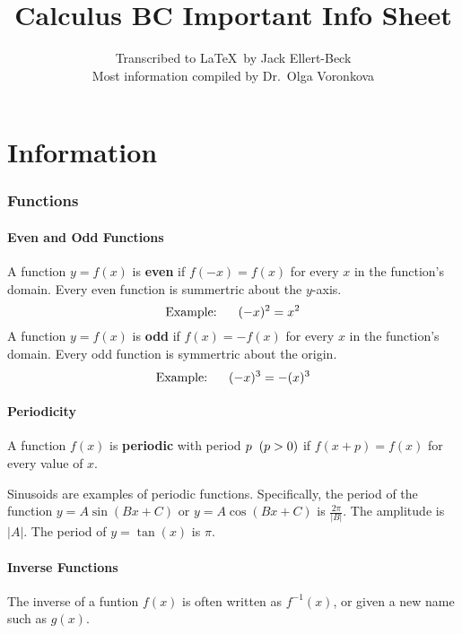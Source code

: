 \documentclass{artikel3}
\begin{document}
\title{Calculus BC Important Info Sheet}
\author{Transcribed to \LaTeX\ by Jack Ellert-Beck\\ 
Most information compiled by Dr.\ Olga Voronkova}
\maketitle

\newpage

\tableofcontents

\newpage

\part{Information}

\section{Functions}

\subsection{Even and Odd Functions}
A function $y=f(x)$ is \textbf{even} if $f(-x)=f(x)$ for every $x$ 
in the function's domain. Every even function is summertric about 
the $y$-axis. \[\text{Example:}\hspace{6 mm} (-x)^2=x^2 \]
A function $y=f(x)$ is \textbf{odd} if $f(x)=-f(x)$ for every $x$ 
in the function's domain. Every odd function is symmertric about 
the origin. \[\text{Example:}\hspace{6 mm} (-x)^3=-(x)^3 \]

\subsection{Periodicity}
A function $f(x)$ is \textbf{periodic} with period $p\hspace{2 mm}(p>0)$ if 
$f(x+p)=f(x)$ for every value of $x$.

Sinusoids are examples of periodic functions. Specifically, the period
of the function $y=A\sin(Bx+C)$ or $y=A\cos(Bx+C)$ is $\frac{2\pi}{|B|}$.
The amplitude is $|A|$. The period of $y=\tan(x)$ is $\pi$.

\subsection{Inverse Functions}
The inverse of a funtion $f(x)$ is often written as $f^{-1}(x)$, or given 
a new name such as $g(x)$.
\end{document}
